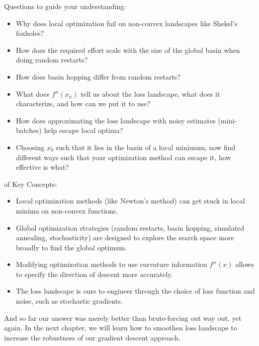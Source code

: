  Questions to guide your understanding:
\begin{itemize}
    \item Why does local optimization fail on non-convex landscapes like Shekel's foxholes?
    \item How does the required effort scale with the size of the global basin when doing random restarts?
    \item How does basin hopping differ from random restarts?
    \item What does $f''(x_n)$ tell us about the loss landscape, what does it characterize, and how can we put it to use?
    \item How does approximating the loss landscape with noisy estimates (mini-batches) help escape local optima?
    \item Choosing $x_0$ such that it lies in the basin of a local minimum, now find different ways such that your optimization method can escape it, how effective is what?
\end{itemize}

 of Key Concepts:
\begin{itemize}
    \item Local optimization methods (like Newton's method) can get stuck in local minima on non-convex functions.
    \item Global optimization strategies (random restarts, basin hopping, simulated annealing, stochasticity) are designed to explore the search space more broadly to find the global optimum.
    \item Modifying optimization methods to use curvature information $f''(x)$ allows to specify the direction of descent more accurately.
    \item The loss landscape is ours to engineer through the choice of loss function and noise, such as stochastic gradients. 
\end{itemize}



 And so far our answer was merely better than brute-forcing out way out, yet again.
In the next chapter, we will learn how to smoothen loss landscape to increase the robustness of our gradient descent approach.




